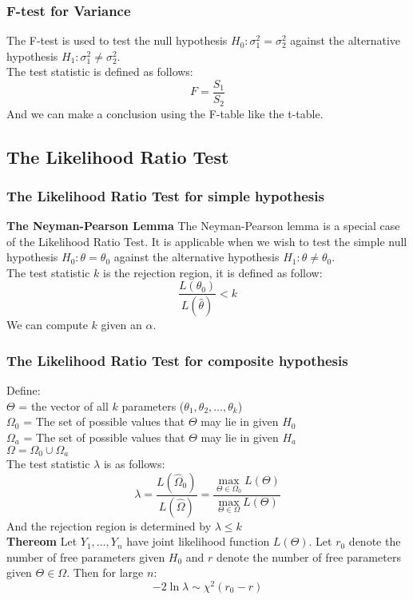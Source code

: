 \documentclass[sn-mathphys,Numbered]{sn-jnl}%
\newcommand{\Theorem}{\textbf{Thereom }}
\begin{document}
\subsubsection{F-test for Variance}\label{f-test}
The F-test is used to test the null hypothesis $H_0: \sigma_1^2 = \sigma_2^2$
against the alternative hypothesis $H_1: \sigma_1^2 \neq \sigma_2^2$.\\ The
test statistic is defined as follows:
\begin{equation}
    F = \frac{S_1}{S_2}
\end{equation}
And we can make a conclusion using the F-table like the t-table.

\subsection{The Likelihood Ratio Test}\label{likelihood-ratio}
\subsubsection{The Likelihood Ratio Test for simple hypothesis}\label{likelihood-ratio-simple}
\textbf{The Neyman-Pearson Lemma}
The Neyman-Pearson lemma is a special case of the Likelihood Ratio Test. It is applicable when we wish to test the simple null hypothesis $H_0: \theta = \theta_0$ against the alternative hypothesis $H_1: \theta \neq \theta_0$.\\
The test statistic $k$ is the rejection region, it is defined as follow:
\begin{equation}
    \frac{L(\theta_0)}{L(\hat \theta)} < k
\end{equation}
We can compute $k$ given an $\alpha$.
\subsubsection{The Likelihood Ratio Test for composite hypothesis}\label{likelihood-ratio-composite}
Define: \\ $\Theta$ = the vector of all $k$ parameters ($\theta_1, \theta_2,
    \dots, \theta_k$)\\ $\Omega_0$ = The set of possible values that $\Theta$ may
lie in given $H_0$ \\ $\Omega_a$ = The set of possible values that $\Theta$ may
lie in given $H_a$ \\ $\Omega = \Omega_0 \cup \Omega_a$ \\The test statistic
$\lambda$ is as follows:
\begin{equation}
    \lambda = \frac{L(\hat \Omega_0)}{L(\hat \Omega)} = \frac{\max_{\Theta \in \Omega_0}L(\Theta)}{\max_{\Theta \in \Omega} L(\Theta)}
\end{equation}
And the rejection region is determined by $\lambda \le k$
\\\Theorem Let $Y_1, \dots, Y_n$ have joint likelihood function $L(\Theta)$. Let $r_0$ denote the number of free parameters given $H_0$ and $r$ denote the number of free parameters given $\Theta \in \Omega$. Then for large $n$:
\begin{equation}
    -2 \ln \lambda \sim \chi^2(r_0-r)
\end{equation}
\end{document}
